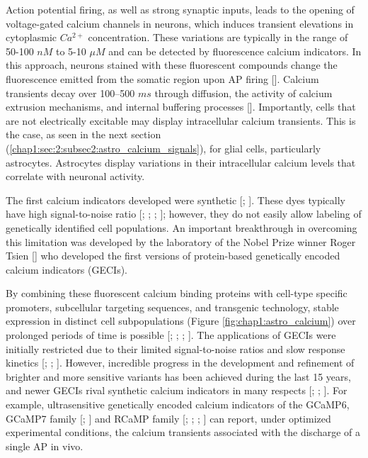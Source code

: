 Action potential firing, as well as strong synaptic inputs, leads to the opening of voltage-gated calcium channels in neurons, which induces transient elevations in cytoplasmic $Ca^{2+}$ concentration.
These variations are typically in the range of 50-100 $nM$ to 5-10 $\mu M$ and can be detected by fluorescence calcium indicators.
In this approach, neurons stained with these fluorescent compounds change the fluorescence emitted from the somatic region upon AP firing [\cite{yuste1991}].
Calcium transients decay over 100–500 $ms$ through diffusion, the activity of calcium extrusion mechanisms, and internal buffering processes [\cite{grienberger2012}].
Importantly, cells that are not electrically excitable may display intracellular calcium transients. 
This is the case, as seen in the next section (\ref{chap1:sec:2:subsec2:astro_calcium_signals}), for glial cells, particularly astrocytes.
Astrocytes display variations in their intracellular calcium levels that correlate with neuronal activity.  
  
The first calcium indicators developed were synthetic [\cite{grienberger2012}; \cite{tsien1981}]. 
These dyes typically have high signal-to-noise ratio [\cite{stosiek2003}; \cite{grienberger2012}; \cite{wiederschain2011}; \cite{helmchen2002}]; however, they do not easily allow labeling of genetically identified cell populations.
An important breakthrough in overcoming this limitation was developed by the laboratory of the Nobel Prize winner Roger Tsien [\cite{miyawaki1997}] who developed the first versions of protein-based genetically encoded calcium indicators (GECIs). 

By combining these fluorescent calcium binding proteins with cell-type specific promoters, subcellular targeting sequences, and transgenic technology, stable expression in distinct cell subpopulations (Figure \ref{fig:chap1:astro_calcium}) over prolonged periods of time is possible [\cite{grienberger2012}; \cite{knopfel2006}; \cite{looger2012}; \cite{chen2013}]. 
The applications of GECIs were initially restricted due to their limited signal-to-noise ratios and slow response kinetics [\cite{ohkura2005}; \cite{tallini2006}; \cite{tian2009}]. 
However, incredible progress in the development and refinement of brighter and more sensitive variants has been achieved during the last 15 years, and newer GECIs rival synthetic calcium indicators in many respects [\cite{horikawa2010}; \cite{palmer2011}; \cite{akerboom2012}]. 
For example, ultrasensitive genetically encoded calcium indicators of the GCaMP6, GCaMP7 family [\cite{chen2013}; \cite{dana2019}] and RCaMP family [\cite{akerboom2013}; \cite{dana2016}; \cite{ohkura2012}; \cite{forli2018}] can report, under optimized experimental conditions, the calcium transients associated with the discharge of a single AP in vivo.
